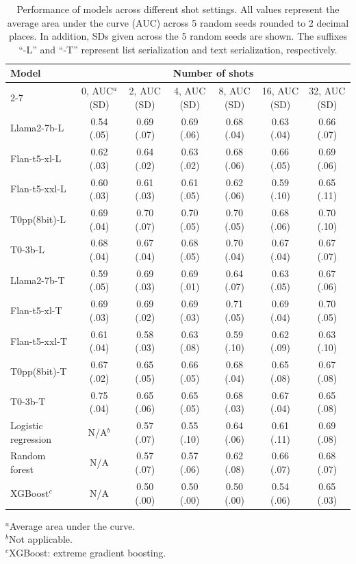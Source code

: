\begin{table}[htbp]
\centering
\small
\setlength{\tabcolsep}{3pt}
\caption[Model performance (AUC) across different numbers of shots]{Performance of models across different shot settings. All values represent the average area under the curve (AUC) across 5 random seeds rounded to 2 decimal places. In addition, SDs given across the 5 random seeds are shown. The suffixes “-L” and “-T” represent list serialization and text serialization, respectively.}
\label{tab:auc_results}
\begin{tabular}{lcccccc}
\toprule
\multicolumn{1}{l}{Model} &
\multicolumn{6}{c}{Number of shots} \\
\cmidrule(lr){2-7}
 & 0, AUC$^{a}$ (SD) & 2, AUC (SD) & 4, AUC (SD) & 8, AUC (SD) & 16, AUC (SD) & 32, AUC (SD) \\
\midrule
Llama2-7b-L      & 0.54 (.05) & 0.69 (.07) & 0.69 (.06) & 0.68 (.04) & 0.63 (.04) & 0.66 (.07) \\
Flan-t5-xl-L     & 0.62 (.03) & 0.64 (.02) & 0.63 (.02) & 0.68 (.06) & 0.66 (.05) & 0.69 (.06) \\
Flan-t5-xxl-L    & 0.60 (.03) & 0.61 (.03) & 0.61 (.05) & 0.62 (.06) & 0.59 (.10) & 0.65 (.11) \\
T0pp(8bit)-L     & 0.69 (.04) & 0.70 (.07) & 0.70 (.05) & 0.70 (.05) & 0.68 (.06) & 0.70 (.10) \\
T0-3b-L          & 0.68 (.04) & 0.67 (.04) & 0.68 (.05) & 0.70 (.04) & 0.67 (.04) & 0.67 (.07) \\
Llama2-7b-T      & 0.59 (.05) & 0.69 (.03) & 0.69 (.01) & 0.64 (.07) & 0.63 (.05) & 0.67 (.06) \\
Flan-t5-xl-T     & 0.69 (.03) & 0.69 (.02) & 0.69 (.03) & 0.71 (.05) & 0.69 (.04) & 0.70 (.05) \\
Flan-t5-xxl-T    & 0.61 (.04) & 0.58 (.03) & 0.63 (.08) & 0.59 (.10) & 0.62 (.09) & 0.63 (.10) \\
T0pp(8bit)-T     & 0.67 (.02) & 0.65 (.05) & 0.66 (.05) & 0.68 (.04) & 0.65 (.08) & 0.67 (.08) \\
T0-3b-T          & 0.75 (.04) & 0.65 (.06) & 0.65 (.05) & 0.68 (.03) & 0.67 (.04) & 0.65 (.08) \\
Logistic regression & N/A$^{b}$ & 0.57 (.07) & 0.55 (.10) & 0.64 (.06) & 0.61 (.11) & 0.69 (.08) \\
Random forest    & N/A        & 0.57 (.07) & 0.57 (.06) & 0.62 (.08) & 0.66 (.07) & 0.68 (.07) \\
XGBoost$^{c}$    & N/A        & 0.50 (.00) & 0.50 (.00) & 0.50 (.00) & 0.54 (.06) & 0.65 (.03) \\
\bottomrule
\end{tabular}
\vspace{0.5em}
\begin{flushleft}
\footnotesize
$^{a}$Average area under the curve.\\
$^{b}$Not applicable.\\
$^{c}$XGBoost: extreme gradient boosting.
\end{flushleft}
\end{table}

